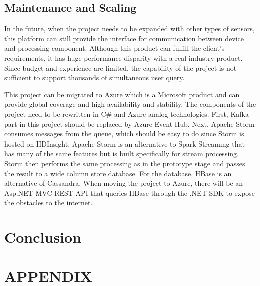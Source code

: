 \documentclass[prodmode,acmtosem]{acmsmall} %
\begin{document}
\subsection{Maintenance and Scaling}
In the future, when the project needs to be expanded with other types of sensors, this platform can still provide the interface for communication between device and processing component. 
Although this product can fulfill the client’s requirements, it has huge performance disparity with a real industry product. Since budget and experience are limited, the capability of the project is not sufficient to support thousands of simultaneous user query.

This project can be migrated to Azure which is a Microsoft product and can provide global coverage and high availability and stability. The components of the project need to be rewritten in C\# and Azure analog technologies. First, Kafka part in this project should be replaced by Azure Event Hub. Next, Apache Storm consumes messages from the queue, which should be easy to do since Storm is hosted on HDInsight. Apache Storm is an alternative to Spark Streaming that has many of the same features but is built specifically for stream processing. Storm then performs the same processing as in the prototype stage and passes the result to a wide column store database. For the database, HBase is an alternative of Cassandra. When moving the project to Azure,  there will be an Asp.NET MVC REST API that queries HBase through the .NET SDK to expose the obstacles to the internet.


\section{Conclusion}


\appendix
\section*{APPENDIX} \label{Appendix}
\setcounter{section}{1}


\begin{acks}
\end{acks}  
\end{document}

